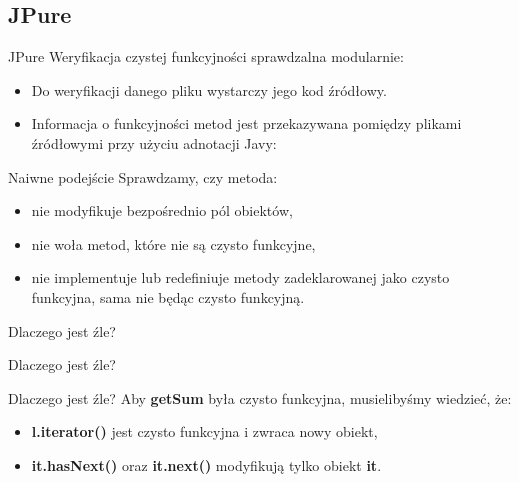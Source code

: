 \documentclass{beamer}
\begin{document}
\subsection{JPure}

\begin{frame}{JPure}
  Weryfikacja czystej funkcyjności sprawdzalna modularnie:
  \begin{itemize}
    \item Do weryfikacji danego pliku wystarczy jego kod źródłowy.
    \item Informacja o funkcyjności metod jest przekazywana 
      pomiędzy plikami źródłowymi przy użyciu adnotacji Javy:
      \pause
      \vspace{0.3in}
      \begin{center}
      \end{center}
  \end{itemize}
\end{frame}

\begin{frame}{Naiwne podejście}
  Sprawdzamy, czy metoda:
  \begin{itemize}
  \item nie modyfikuje bezpośrednio pól obiektów,
  \item nie woła metod, które nie są czysto funkcyjne, 
  \item nie implementuje lub redefiniuje metody zadeklarowanej jako
    czysto funkcyjna, sama nie będąc czysto funkcyjną.
  \end{itemize}
  \pause
  \begin{center}
    \alert{Dlaczego jest źle?}
  \end{center}
\end{frame}

\begin{frame}{Dlaczego jest źle?}
  
\end{frame}

\begin{frame}{Dlaczego jest źle?}
  Aby \textbf{getSum} była czysto funkcyjna, musielibyśmy wiedzieć, że:
  \begin{itemize}
    \item \textbf{l.iterator()} jest czysto funkcyjna i zwraca nowy
      obiekt, 
    \item \textbf{it.hasNext()} oraz \textbf{it.next()} modyfikują 
      tylko obiekt \textbf{it}.
  \end{itemize}
\end{frame}
\end{document}

